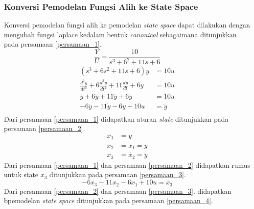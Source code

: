 \documentclass[../main.tex]{subfiles}
\begin{document}
            \subsubsection{Konversi Pemodelan Fungsi Alih ke State Space}
                Konversi pemodelan fungsi alih ke pemodelan \textit{state space} dapat dilakukan dengan mengubah fungsi laplace kedalam bentuk \textit{canonical} sebagaimana ditunjukkan pada persamaan \eqref{persamaan_1}.
                \begin{equation}
                    \frac{Y}{U} = \frac{10}{s^3 + 6^2 + 11s + 6}
                \end{equation}
                \begin{equation}
                    \begin{split}
                        (s^3 + 6s^2 + 11s + 6) y &= 10u \\[5pt]
                        \frac{d^3y}{dt^3} + 6\frac{d^2y}{dt^2} + 11\frac{dy}{dt} + 6y &= 10u \\[5pt]
                        \dddot{y} + 6\ddot{y} + 11 \dot{y} + 6y &= 10u\\[5pt]
                        -6\ddot{y} - 11 \dot{y} - 6y + 10u &= \dddot{y}\\[5pt]
                        \label{persamaan_1}
                    \end{split}
                \end{equation}
                Dari persamaan \eqref{persamaan_1} didapatkan aturan \textit{state} ditunjukkan pada persamaan \eqref{persamaan_2}.
                \begin{equation}
                    \begin{split}
                        x_1 &= y \\[5pt]
                        x_2 &= \dot{x_1} = \dot{y} \\[5pt]
                        x_3 &= \dot{x_2} = \ddot{y}
                        \label{persamaan_2}
                    \end{split}
                \end{equation}
                Dari persamaan \eqref{persamaan_1} dan persamaan \eqref{persamaan_2} didapatkan rumus untuk state $\dot{x_3}$ ditunjukkan pada persamaan \eqref{persamaan_3}.
                \begin{equation}
                    -6x_3 - 11x_2 - 6x_1 + 10u = \dot{x_3}
                    \label{persamaan_3}
                \end{equation}
                Dari persamaan \eqref{persamaan_2} dan persamaan \eqref{persamaan_3}. didapatkan bpemodelan \textit{state space} ditunjukkan pada persamaan \eqref{persamaan_4}.
\end{document}
